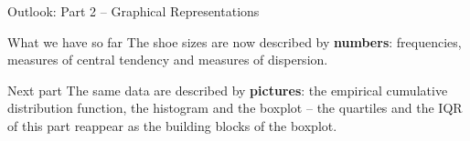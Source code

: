 \documentclass[aspectratio=169,11pt]{beamer}
\begin{document}
\begin{frame}{Outlook: Part 2 -- Graphical Representations}
  \begin{block}{What we have so far}
    The shoe sizes are now described by \textbf{numbers}: frequencies,
    measures of central tendency and measures of dispersion.
  \end{block}
  \begin{block}{Next part}
    The same data are described by \textbf{pictures}: the empirical
    cumulative distribution function, the histogram and the boxplot --
    the quartiles and the IQR of this part reappear as the building blocks
    of the boxplot.
  \end{block}
\end{frame}
\end{document}
